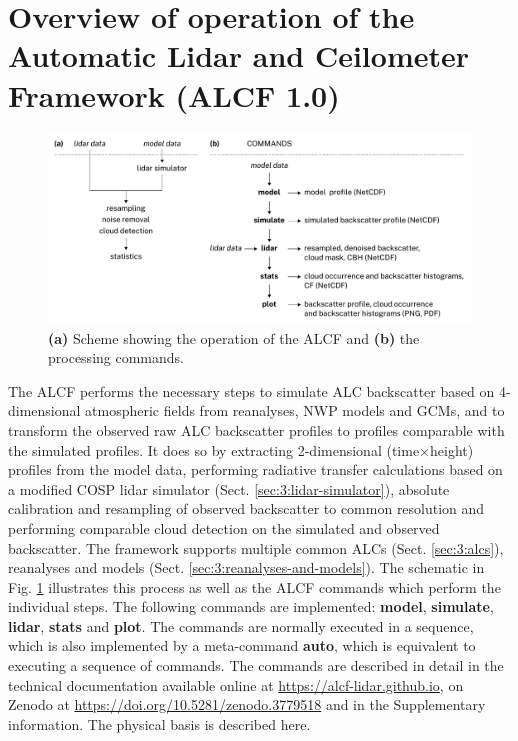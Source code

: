 \section{Overview of operation of the Automatic Lidar and Ceilometer Framework (ALCF 1.0)}
\label{sec:3:alcf}

\begin{figure}[t]
\centering
\includegraphics[width=\textwidth]{chapter3/fig/scheme.pdf}
\caption[Scheme showing the operation of the ALCF and the processing commands]{\textbf{(a)} Scheme showing the operation of the ALCF and \textbf{(b)} the processing commands.}
\label{fig:3:scheme}
\end{figure}

The ALCF performs the necessary
steps to simulate ALC backscatter based on 4-dimensional atmospheric fields
from reanalyses, NWP models and GCMs, and to transform the observed raw ALC
backscatter profiles to profiles comparable with the simulated profiles.
It does so by extracting 2-dimensional (time$\times$height) profiles from the
model data, performing radiative transfer calculations based on a modified COSP
lidar simulator (Sect. \ref{sec:3:lidar-simulator}),
absolute calibration and resampling of observed backscatter
to common resolution and performing comparable cloud detection on the simulated
and observed backscatter.
The framework
supports multiple common ALCs (Sect. \ref{sec:3:alcs}), reanalyses and models
(Sect. \ref{sec:3:reanalyses-and-models}).
The schematic in Fig. \ref{fig:3:scheme} illustrates this process
as well as the ALCF commands which perform the individual steps.
The following commands are implemented: \textbf{model}, \textbf{simulate},
\textbf{lidar}, \textbf{stats} and \textbf{plot}. The commands are normally
executed in a sequence, which is also implemented by a meta-command \textbf{auto},
which is equivalent to executing a sequence of commands. The commands are
described in detail in the technical documentation available online at
\url{https://alcf-lidar.github.io}, on Zenodo at \url{https://doi.org/10.5281/zenodo.3779518}
and in the Supplementary information. The physical basis is described here.

